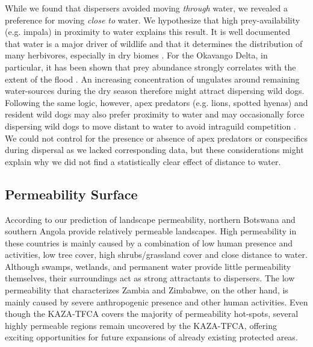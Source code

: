 \documentclass[abstract=on,10pt,a4paper,bibliography=totocnumbered]{scrartcl}
\begin{document}
While we found that dispersers avoided moving \textit{through} water, we
revealed a preference for moving \textit{close to} water. We hypothesize that
high prey-availability (e.g. impala) in proximity to water explains this result.
It is well documented that water is a major driver of wildlife and that it
determines the distribution of many herbivores, especially in dry biomes
\citep{Western.1975}. For the Okavango Delta, in particular, it has been shown
that prey abundance strongly correlates with the extent of the flood
\citep{Bonyongo.2005}. An increasing concentration of ungulates around remaining
water-sources during the dry season \citep{Ogutu.2014} therefore might attract
dispersing wild dogs. Following the same logic, however, apex predators (e.g.
lions, spotted hyenas) and resident wild dogs may also prefer proximity to water
\citep{Valeix.2009} and may occasionally force dispersing wild dogs to move
distant to water \citep{Ndaimani.2016} to avoid intraguild competition
\citep{Creel.1996, Mills.1997}. We could not control for the presence or absence
of apex predators or conspecifics during dispersal as we lacked corresponding
data, but these considerations might explain why we did not find a statistically
clear effect of distance to water.

\subsection{Permeability Surface}
According to our prediction of landscape permeability, northern Botswana and
southern Angola provide relatively permeable landscapes. High permeability in
these countries is mainly caused by a combination of low human presence and
activities, low tree cover, high shrubs/grassland cover and close distance to
water. Although swamps, wetlands, and permanent water provide little
permeability themselves, their surroundings act as strong attractants to
dispersers. The low permeability that characterizes Zambia and Zimbabwe, on the
other hand, is mainly caused by severe anthropogenic presence and other human
activities. Even though the KAZA-TFCA covers the majority of permeability
hot-spots, several highly permeable regions remain uncovered by the KAZA-TFCA,
offering exciting opportunities for future expansions of already existing
protected areas.
\end{document}
